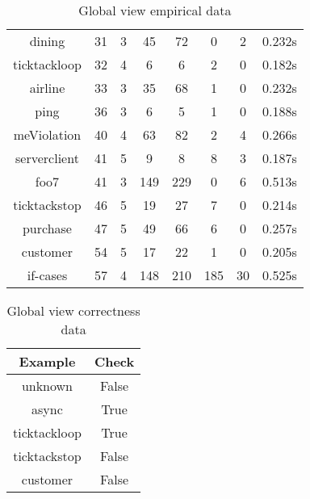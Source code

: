 \begin{table}[!ht]
\begin{tabular}{|c|c|c|c|c|c|c|c|}
dining & 31 & 3 & 45 & 72 & 0 & 2 & 0.232s \\ 
ticktackloop & 32 & 4 & 6 & 6 & 2 & 0 & 0.182s \\ 
airline & 33 & 3 & 35 & 68 & 1 & 0 & 0.232s \\ 
ping & 36 & 3 & 6 & 5 & 1 & 0 & 0.188s \\ 
meViolation & 40 & 4 & 63 & 82 & 2 & 4 & 0.266s \\ 
serverclient & 41 & 5 & 9 & 8 & 8 & 3 & 0.187s \\ 
foo7 & 41 & 3 & 149 & 229 & 0 & 6 & 0.513s \\ 
ticktackstop & 46 & 5 & 19 & 27 & 7 & 0 & 0.214s \\ 
purchase & 47 & 5 & 49 & 66 & 6 & 0 & 0.257s \\ 
customer & 54 & 5 & 17 & 22 & 1 & 0 & 0.205s \\ 
if-cases & 57 & 4 & 148 & 210 & 185 & 30 & 0.525s \\ 
\hline
\end{tabular}
\caption{Global view empirical data}
\label{tab:gvbench}
\end{table}


\begin{table}[!ht]
\centering
\begin{tabular}{|c|c|}
\hline
Example & Check \\ 
\hline
unknown & False \\ 
async & True \\ 
ticktackloop & True \\ 
ticktackstop & False \\ 
customer & False \\ 
\hline
\end{tabular}
\caption{Global view correctness data}
\label{tab:corrbench}
\end{table}

